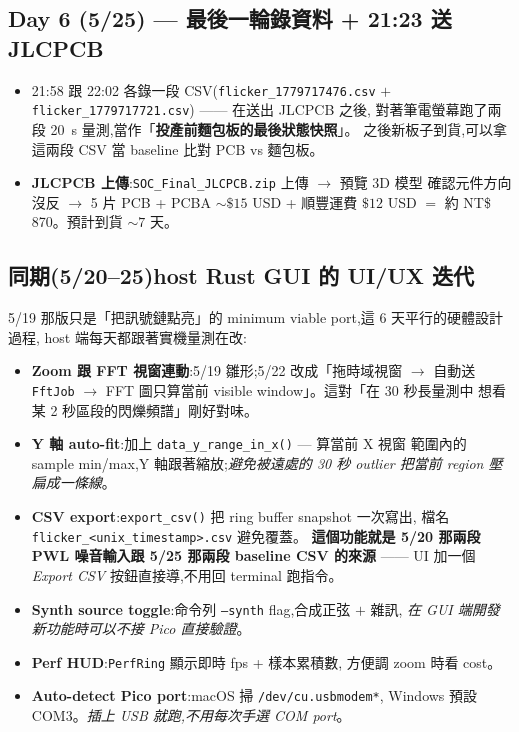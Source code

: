 \subsection*{Day 6 (5/25) — 最後一輪錄資料 + 21:23 送 JLCPCB}

\begin{itemize}[leftmargin=2em,itemsep=0pt]
  \item 21:58 跟 22:02 各錄一段 CSV(\texttt{flicker\_1779717476.csv} \(+\)
        \texttt{flicker\_1779717721.csv}) —— 在送出 JLCPCB 之後,
        對著筆電螢幕跑了兩段 \SI{20}{\second} 量測,當作「\textbf{投產前麵包板的最後狀態快照}」。
        之後新板子到貨,可以拿這兩段 CSV 當 baseline 比對 PCB vs 麵包板。
  \item \textbf{JLCPCB 上傳}:\texttt{SOC\_Final\_JLCPCB.zip} 上傳 \(\to\) 預覽 3D 模型
        確認元件方向沒反 \(\to\) 5 片 PCB + PCBA \(\sim \$15\) USD + 順豐運費 \(\$12\) USD
        \(=\) 約 NT\$ 870。預計到貨 \(\sim 7\) 天。
\end{itemize}

\subsection*{同期(5/20--25)host Rust GUI 的 UI/UX 迭代}

5/19 那版只是「把訊號鏈點亮」的 minimum viable port,這 6 天平行的硬體設計過程,
host 端每天都跟著實機量測在改:

\begin{itemize}[leftmargin=2em,itemsep=0pt]
  \item \textbf{Zoom 跟 FFT 視窗連動}:5/19 雛形;5/22 改成「拖時域視窗 \(\to\) 自動送
        \texttt{FftJob} \(\to\) FFT 圖只算當前 visible window」。這對「在 30 秒長量測中
        想看某 2 秒區段的閃爍頻譜」剛好對味。
  \item \textbf{Y 軸 auto-fit}:加上 \texttt{data\_y\_range\_in\_x()} — 算當前 X 視窗
        範圍內的 sample min/max,Y 軸跟著縮放;\emph{避免被遠處的 30 秒 outlier
        把當前 region 壓扁成一條線}。
  \item \textbf{CSV export}:\texttt{export\_csv()} 把 ring buffer snapshot 一次寫出,
        檔名 \texttt{flicker\_<unix\_timestamp>.csv} 避免覆蓋。
        \textbf{這個功能就是 5/20 那兩段 PWL 噪音輸入跟 5/25 那兩段 baseline
        CSV 的來源} —— UI 加一個 \emph{Export CSV} 按鈕直接導,不用回 terminal 跑指令。
  \item \textbf{Synth source toggle}:命令列 \texttt{--synth} flag,合成正弦 \(+\) 雜訊,
        \emph{在 GUI 端開發新功能時可以不接 Pico 直接驗證}。
  \item \textbf{Perf HUD}:\texttt{PerfRing} 顯示即時 fps + 樣本累積數,
        方便調 zoom 時看 cost。
  \item \textbf{Auto-detect Pico port}:macOS 掃 \texttt{/dev/cu.usbmodem*},
        Windows 預設 COM3。\emph{插上 USB 就跑,不用每次手選 COM port}。
\end{itemize}

